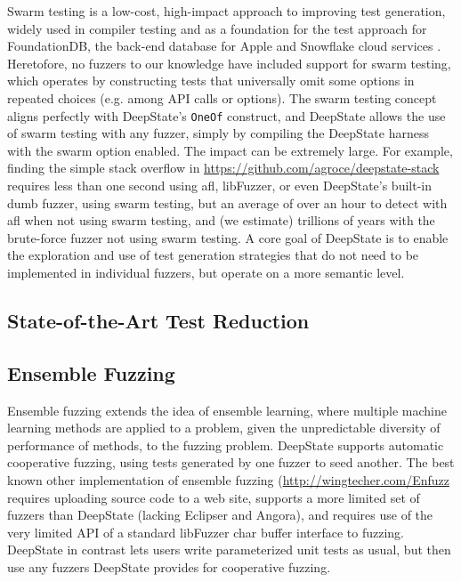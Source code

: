 \documentclass[sigconf]{acmart}
\begin{document}
Swarm testing \cite{ISSTA12,groce2013help} is a low-cost, high-impact approach to improving test generation, widely used in compiler testing \cite{le2014compiler,dewey2015fuzzing} and as a foundation for the test approach for FoundationDB, the back-end database for Apple and Snowflake cloud services \cite{zhou2021foundationdb}.  Heretofore, no fuzzers to our knowledge have included support for swarm testing, which operates by constructing tests that universally omit some options in repeated choices (e.g. among API calls or options).  The swarm testing concept aligns perfectly with DeepState's {\tt OneOf} construct, and DeepState allows the use of swarm testing with any fuzzer, simply by compiling the DeepState harness with the swarm option enabled.  The impact can be extremely large.  For example, finding the simple stack overflow in \url{https://github.com/agroce/deepstate-stack} requires less than one second using afl, libFuzzer, or even DeepState's built-in dumb fuzzer, using swarm testing, but an average of over an hour to detect with afl when not using swarm testing, and (we estimate) trillions of years with the brute-force fuzzer not using swarm testing.  A core goal of DeepState is to enable the exploration and use of test generation strategies that do not need to be implemented in individual fuzzers, but operate on a more semantic level.

\subsection{State-of-the-Art Test Reduction}

\subsection{Ensemble Fuzzing}

Ensemble fuzzing \cite{chen2019enfuzz} extends the idea of ensemble learning, where multiple machine learning methods are applied to a problem, given the unpredictable diversity of performance of methods, to the fuzzing problem.  DeepState supports automatic cooperative fuzzing, using tests generated by one fuzzer to seed another.  The best known other implementation of ensemble fuzzing (\url{http://wingtecher.com/Enfuzz} requires uploading source code to a web site, supports a more limited set of fuzzers than DeepState (lacking Eclipser and Angora), and requires use of the very limited API of a standard libFuzzer char buffer interface to fuzzing.  DeepState in contrast lets users write parameterized unit tests as usual, but then use any fuzzers DeepState provides for cooperative fuzzing.
\end{document}
